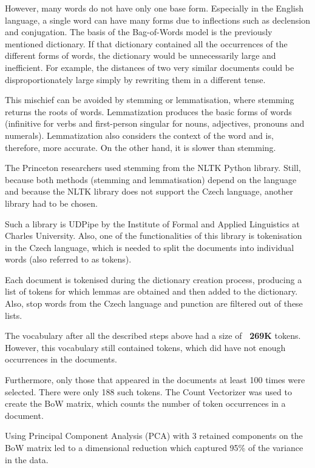         However, many words do not have only one base form. Especially in the English language, a single word can have many forms due to inflections such as declension and conjugation. The basis of the Bag-of-Words model is the previously mentioned dictionary. If that dictionary contained all the occurrences of the different forms of words, the dictionary would be unnecessarily large and inefficient. For example, the distances of two very similar documents could be disproportionately large simply by rewriting them in a different tense.

        This mischief can be avoided by stemming or lemmatisation, where stemming returns the roots of words. Lemmatization produces the basic forms of words (infinitive for verbs and first-person singular for nouns, adjectives, pronouns and numerals). Lemmatization also considers the context of the word and is, therefore, more accurate\cite{stemming-and-lemmatisation}. On the other hand, it is slower than stemming.

        The Princeton researchers used stemming from the NLTK Python library\cite{nltk}. Still, because both methods (stemming and lemmatisation) depend on the language and because the NLTK library does not support the Czech language, another library had to be chosen.

        Such a library is UDPipe\cite{udpipe} by the Institute of Formal and Applied Linguistics at Charles University. Also, one of the functionalities of this library is tokenisation in the Czech language, which is needed to split the documents into individual words (also referred to as tokens)\cite{tokenisation}.

        Each document is tokenised during the dictionary creation process, producing a list of tokens for which lemmas are obtained and then added to the dictionary. Also, stop words from the Czech language and punction are filtered out of these lists.

        The vocabulary after all the described steps above had a size of \textbf{~269K} tokens. However, this vocabulary still contained tokens, which did have not enough occurrences in the documents.

        Furthermore, only those that appeared in the documents at least 100 times were selected. There were only 188 such tokens. The Count Vectorizer\cite{count-vectorizer} was used to create the BoW matrix, which counts the number of token occurrences in a document. 

        Using Principal Component Analysis (PCA) with 3 retained components on the BoW matrix led to a dimensional reduction which captured 95\% of the variance in the data.

